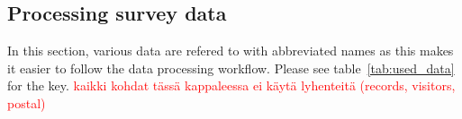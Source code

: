 \newpage
\subsection{Processing survey data}
\label{sec:processdata} %
\justify

In this section, various data are refered to with abbreviated names as this makes it easier to follow the data processing workflow. Please see table~\ref{tab:used_data} for the key. \textcolor{red}{kaikki kohdat tässä kappaleessa ei käytä lyhenteitä (records, visitors, postal)}

